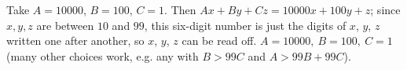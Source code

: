 Take $A=10000$, $B=100$, $C=1$. Then $Ax+By+Cz=10000x+100y+z$; since $x,y,z$ are between $10$ and $99$, this six-digit number is just the digits of $x$, $y$, $z$ written one after another, so $x$, $y$, $z$ can be read off. $\boxed{A=10000,\ B=100,\ C=1}$ (many other choices work, e.g. any with $B>99C$ and $A>99B+99C$).
